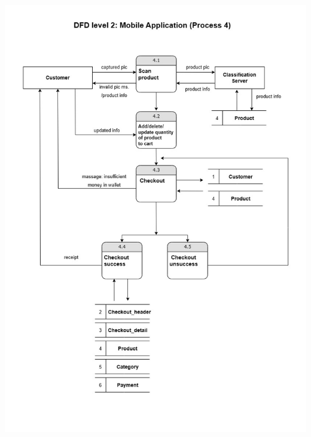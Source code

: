 \begin{center}
    \includegraphics[scale=0.25]{pic/dataflow/dataflow-mobile2-2.jpg}\\
    \vspace{2cm}

\end{center}
